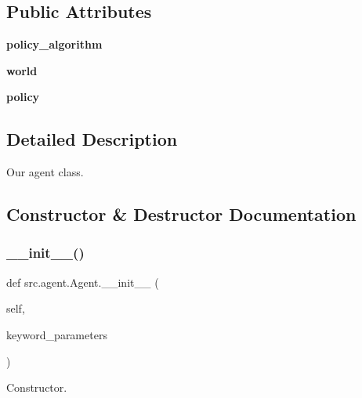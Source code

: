 \subsection*{Public Attributes}
\begin{DoxyCompactItemize}
\item 
\mbox{\label{classsrc_1_1agent_1_1_agent_aca24ae6676dedefced214e91ab59f00e}} 
{\bfseries policy\+\_\+algorithm}
\item 
\mbox{\label{classsrc_1_1agent_1_1_agent_aa0cf3c2461ab9f02d74346aef220a9fb}} 
{\bfseries world}
\item 
\mbox{\label{classsrc_1_1agent_1_1_agent_ad7643c30d167776e65804a2b7c8d66ef}} 
{\bfseries policy}
\end{DoxyCompactItemize}


\subsection{Detailed Description}
Our agent class. 



\subsection{Constructor \& Destructor Documentation}
\mbox{\label{classsrc_1_1agent_1_1_agent_a86883ad8e273a62d61634e0ecbdcf1ed}} 
\subsubsection{\texorpdfstring{\+\_\+\+\_\+init\+\_\+\+\_\+()}{\_\_init\_\_()}}
{\footnotesize\ttfamily def src.\+agent.\+Agent.\+\_\+\+\_\+init\+\_\+\+\_\+ (\begin{DoxyParamCaption}\item[{}]{self,  }\item[{}]{keyword\+\_\+parameters }\end{DoxyParamCaption})}



Constructor. 


